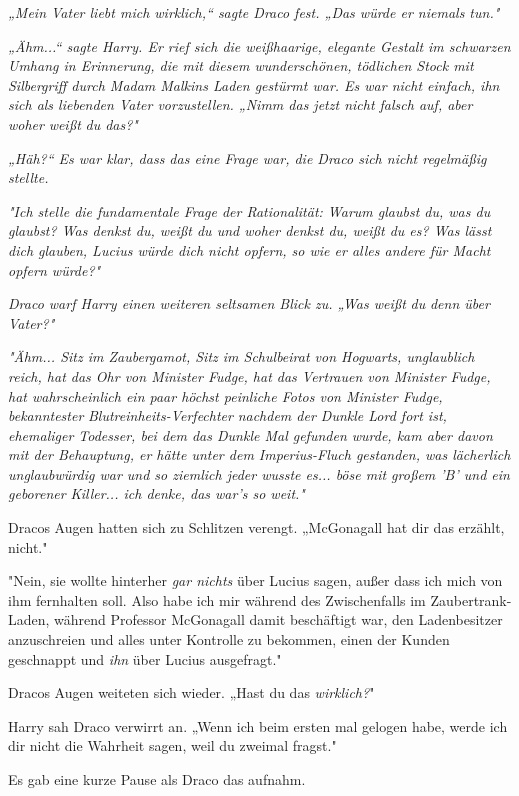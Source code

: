 {\emph{„Mein Vater liebt mich wirklich,“ sagte Draco fest. „Das würde er niemals tun."}

\emph{„Ähm...“ sagte Harry. Er rief sich die weißhaarige, elegante Gestalt im schwarzen Umhang in Erinnerung, die mit diesem wunderschönen, tödlichen Stock mit Silbergriff durch Madam Malkins Laden gestürmt war. Es war nicht einfach, ihn sich als liebenden Vater vorzustellen. „Nimm das jetzt nicht falsch auf, aber woher} \emph{\emph{weißt}} \emph{du das?"}

\emph{„Häh?“ Es war klar, dass das eine Frage war, die Draco sich nicht regelmäßig stellte.}

\emph{"Ich stelle die fundamentale Frage der Rationalität: Warum glaubst du, was du glaubst? Was denkst du, weißt du und woher denkst du, weißt du es? Was lässt dich glauben, Lucius würde dich nicht opfern, so wie er alles andere für Macht opfern würde?"}

\emph{Draco warf Harry einen weiteren seltsamen Blick zu. „Was weißt} \emph{\emph{du}} \emph{denn über Vater?"}

\emph{"Ähm... Sitz im Zaubergamot, Sitz im Schulbeirat von Hogwarts, unglaublich reich, hat das Ohr von Minister Fudge, hat das Vertrauen von Minister Fudge, hat wahrscheinlich ein paar höchst peinliche Fotos von Minister Fudge, bekanntester} \emph{Blutreinheits-Verfechter} \emph{nachdem der Dunkle Lord fort ist, ehemaliger Todesser, bei dem das Dunkle Mal gefunden wurde, kam aber davon mit der Behauptung, er hätte unter dem Imperius-Fluch gestanden, was lächerlich unglaubwürdig war und so ziemlich jeder wusste es... böse mit großem 'B' und ein geborener Killer... ich denke, das war's so weit."}

Dracos Augen hatten sich zu Schlitzen verengt. „McGonagall hat dir das erzählt, nicht."

"Nein, sie wollte hinterher \emph{gar nichts} über Lucius sagen, außer dass ich mich von ihm fernhalten soll. Also habe ich mir während des Zwischenfalls im Zaubertrank-Laden, während Professor McGonagall damit beschäftigt war, den Ladenbesitzer anzuschreien und alles unter Kontrolle zu bekommen, einen der Kunden geschnappt und \emph{ihn} über Lucius ausgefragt."

Dracos Augen weiteten sich wieder. „Hast du das \emph{wirklich?}"

Harry sah Draco verwirrt an. „Wenn ich beim ersten mal gelogen habe, werde ich dir nicht die Wahrheit sagen, weil du zweimal fragst."

Es gab eine kurze Pause als Draco das aufnahm.

}
